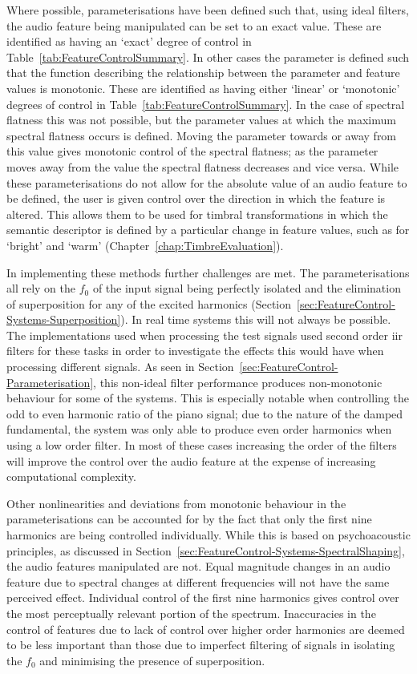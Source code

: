 	Where possible, parameterisations have been defined such that, using ideal filters, the audio feature being
	manipulated can be set to an exact value. These are identified as having an `exact' degree of control in
	Table~\ref{tab:FeatureControlSummary}. In other cases the parameter is defined such that the function describing
	the relationship between the parameter and feature values is monotonic. These are identified as having either
	`linear' or `monotonic' degrees of control in Table~\ref{tab:FeatureControlSummary}. In the case of spectral
	flatness this was not possible, but the parameter values at which the maximum spectral flatness occurs is defined.
	Moving the parameter towards or away from this value gives monotonic control of the spectral flatness; as the
	parameter moves away from the value the spectral flatness decreases and vice versa. While these parameterisations
	do not allow for the absolute value of an audio feature to be defined, the user is given control over the direction
	in which the feature is altered. This allows them to be used for timbral transformations in which the semantic
	descriptor is defined by a particular change in feature values, such as for `bright' and `warm'
	(Chapter~\ref{chap:TimbreEvaluation}).

	In implementing these methods further challenges are met. The parameterisations all rely on the $f_{0}$ of the
	input signal being perfectly isolated and the elimination of superposition for any of the excited harmonics
	(Section~\ref{sec:FeatureControl-Systems-Superposition}). In real time systems this will not always be possible.
	The implementations used when processing the test signals used second order \acrshort{iir} filters for these tasks
	in order to investigate the effects this would have when processing different signals. As seen in
	Section~\ref{sec:FeatureControl-Parameterisation}, this non-ideal filter performance produces non-monotonic
	behaviour for some of the systems. This is especially notable when controlling the odd to even harmonic ratio of
	the piano signal; due to the nature of the damped fundamental, the system was only able to produce even order
	harmonics when using a low order filter. In most of these cases increasing the order of the filters will improve
	the control over the audio feature at the expense of increasing computational complexity.

	Other nonlinearities and deviations from monotonic behaviour in the parameterisations can be accounted for by the
	fact that only the first nine harmonics are being controlled individually. While this is based on psychoacoustic
	principles, as discussed in Section~\ref{sec:FeatureControl-Systems-SpectralShaping}, the audio features
	manipulated are not. Equal magnitude changes in an audio feature due to spectral changes at different frequencies
	will not have the same perceived effect. Individual control of the first nine harmonics gives control over the most
	perceptually relevant portion of the spectrum. Inaccuracies in the control of features due to lack of control over
	higher order harmonics are deemed to be less important than those due to imperfect filtering of signals in
	isolating the $f_{0}$ and minimising the presence of superposition.


